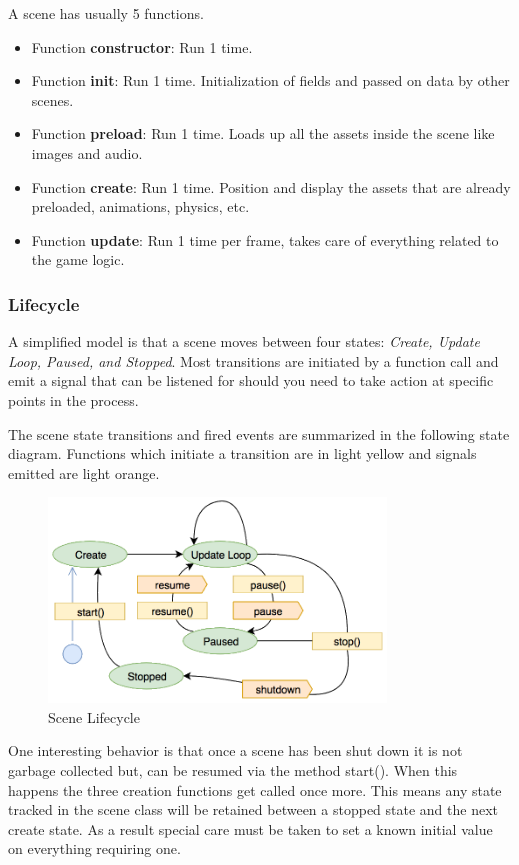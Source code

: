 A scene has usually 5 functions.

\begin{itemize}
    \item Function \textbf{constructor}: Run 1 time.
    \item Function \textbf{init}: Run 1 time. Initialization of fields and passed on data by other scenes.
    \item Function \textbf{preload}: Run 1 time. Loads up all the assets inside the scene like images and audio.
    \item Function \textbf{create}: Run 1 time. Position and display the assets that are already preloaded, animations, physics, etc.
    \item Function \textbf{update}: Run 1 time per frame, takes care of everything related to the game logic.
\end{itemize}

\subsubsection{Lifecycle}
A simplified model is that a scene moves between four states: \textit{Create, Update Loop, Paused, and Stopped}.
Most transitions are initiated by a function call and emit a signal that can be listened for
should you need to take action at specific points in the process.

The scene state transitions and fired events are summarized in the following state diagram.
Functions which initiate a transition are in light yellow and signals emitted are light orange.

\begin{figure}[H]
    \centering
    \includegraphics[width=0.8\textwidth]{figures/lifecycle}
    \caption{Scene Lifecycle}
    \label{fig:lifecycle}
\end{figure}

One interesting behavior is that once a scene has been shut down it is not garbage collected but,
can be resumed via the method start().
When this happens the three creation functions get called once more.
This means any state tracked in the scene class will be retained between a stopped state and the next create state.
As a result special care must be taken to set a known initial value on everything requiring one.

